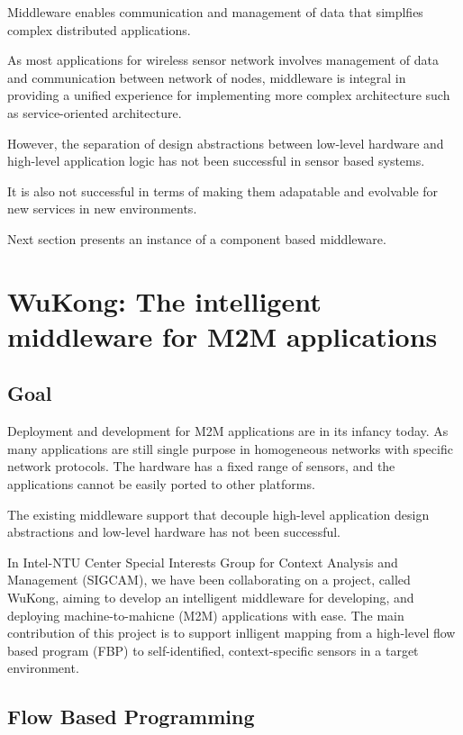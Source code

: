 Middleware enables communication and management of data that simplfies 
complex distributed applications.

As most applications for wireless sensor network involves management of data and
communication between network of nodes, middleware is integral in providing
a unified experience for implementing more complex architecture such as 
service-oriented architecture.

However, the separation of design abstractions between low-level hardware and
high-level application logic has not been successful in sensor based systems.

It is also not successful in terms of making them adapatable and evolvable 
for new services in new environments.

Next section presents an instance of a component based middleware.

\section{WuKong: The intelligent middleware for M2M applications}

\subsection{Goal}

Deployment and development for M2M applications are in its infancy today. As
many applications are still single purpose in homogeneous networks with
specific network protocols. The hardware has a fixed range of sensors, and the
applications cannot be easily ported to other platforms.

The existing middleware support that decouple high-level application design
abstractions and low-level hardware has not been successful.

In Intel-NTU Center Special Interests Group for Context Analysis and Management 
(SIGCAM), we have been collaborating on a project, called WuKong, aiming to develop 
an intelligent middleware for developing, and deploying machine-to-mahicne 
(M2M) applications with ease. The main contribution of this project is to support
inlligent mapping from a high-level flow based program (FBP) to
self-identified, context-specific sensors in a target
environment\cite{Reijers}.

\subsection{Flow Based Programming}

